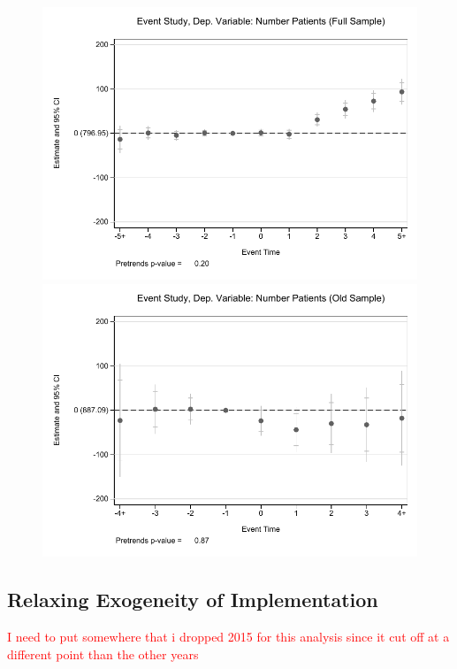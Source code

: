 \documentclass[11pt]{article}
\begin{document}
\begin{figure}[ht]
\caption{}
        \begin{minipage}[b]{0.47\linewidth}
            \centering
            \includegraphics[width=\textwidth]{Objects/prod_eventstudy_fullsample.pdf}
        \end{minipage}
        \hspace{0.2cm}
        \begin{minipage}[b]{0.47\linewidth}
            \centering
            \includegraphics[width=\textwidth]{Objects/prod_eventstudy_oldsample.pdf}
        \end{minipage}
\end{figure}

\subsection{Relaxing Exogeneity of Implementation}


\textcolor{red}{I need to put somewhere that i dropped 2015 for this analysis since it cut off at a different point than the other years}
\end{document}
